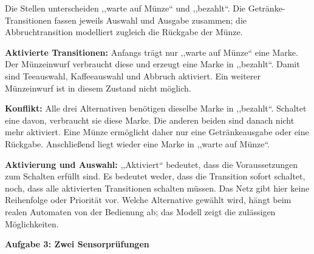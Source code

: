 \begin{loesung}
Die Stellen unterscheiden ,,warte auf Münze`` und ,,bezahlt``.
Die Getränke-Transitionen fassen jeweils Auswahl und Ausgabe zusammen;
die Abbruchtransition modelliert zugleich die Rückgabe der Münze.
\begin{center}
\end{center}

\textbf{Aktivierte Transitionen:} Anfangs trägt nur ,,warte auf Münze`` eine
Marke. Der Münzeinwurf verbraucht diese und erzeugt eine Marke in ,,bezahlt``.
Damit sind Teeauswahl, Kaffeeauswahl und Abbruch aktiviert. Ein weiterer
Münzeinwurf ist in diesem Zustand nicht möglich.

\textbf{Konflikt:} Alle drei Alternativen benötigen dieselbe Marke in ,,bezahlt``.
Schaltet eine davon, verbraucht sie diese Marke. Die anderen beiden sind danach
nicht mehr aktiviert. Eine Münze ermöglicht daher nur eine Getränkeausgabe
oder eine Rückgabe. Anschließend liegt wieder eine Marke in ,,warte auf Münze``.

\textbf{Aktivierung und Auswahl:} ,,Aktiviert`` bedeutet, dass die Voraussetzungen
zum Schalten erfüllt sind. Es bedeutet weder, dass die Transition sofort schaltet,
noch, dass alle aktivierten Transitionen schalten müssen. Das Netz gibt hier
keine Reihenfolge oder Priorität vor. Welche Alternative gewählt wird, hängt
beim realen Automaten von der Bedienung ab; das Modell zeigt die zulässigen Möglichkeiten.

\clearpage
\textbf{Aufgabe 3: Zwei Sensorprüfungen}


\end{loesung}
